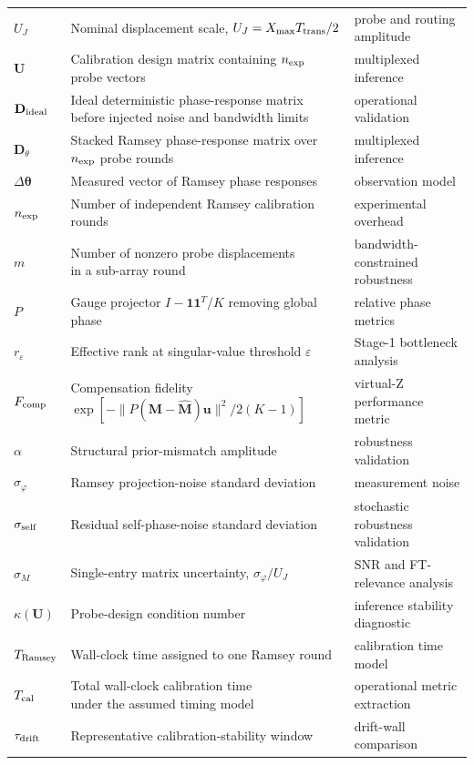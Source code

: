 \documentclass[a4paper,twocolumn,11pt]{quantumarticle}
\begin{document}
\begin{table}[t!]
\begin{tabular}{lll}
$U_J$ & \makecell[l]{Nominal displacement scale, \\ $U_J=X_{\max}T_{\rm trans}/2$} & probe and routing amplitude \\
$\mathbf U$ & \makecell[l]{Calibration design matrix containing \\ $n_{\rm exp}$ probe vectors} & multiplexed inference \\
$\mathbf D_{\rm ideal}$ & \makecell[l]{Ideal deterministic phase-response matrix \\ before injected noise and bandwidth limits} & operational validation \\
$\mathbf D_\theta$ & \makecell[l]{Stacked Ramsey phase-response matrix \\ over $n_{\rm exp}$ probe rounds} & multiplexed inference \\
$\Delta\boldsymbol\theta$ & Measured vector of Ramsey phase responses & observation model \\
$n_{\rm exp}$ & Number of independent Ramsey calibration rounds & experimental overhead \\
$m$ & \makecell[l]{Number of nonzero probe displacements \\ in a sub-array round} & bandwidth-constrained robustness \\
$P$ & \makecell[l]{Gauge projector $I-\mathbf 1\mathbf 1^{T}/K$ \\ removing global phase} & relative phase metrics \\
$r_\varepsilon$ & Effective rank at singular-value threshold $\varepsilon$ & Stage-1 bottleneck analysis \\
$F_{\rm comp}$ & \makecell[l]{Compensation fidelity \\ $\exp[-\|P(\mathbf M-\hat{\mathbf M})\mathbf u\|^2/2(K-1)]$} & virtual-Z performance metric \\
$\alpha$ & Structural prior-mismatch amplitude & robustness validation \\
$\sigma_\varphi$ & Ramsey projection-noise standard deviation & measurement noise \\
$\sigma_{\rm self}$ & Residual self-phase-noise standard deviation & stochastic robustness validation \\
$\sigma_M$ & Single-entry matrix uncertainty, $\sigma_\varphi/U_J$ & SNR and FT-relevance analysis \\
$\kappa(\mathbf U)$ & Probe-design condition number & inference stability diagnostic \\
$T_{\rm Ramsey}$ & Wall-clock time assigned to one Ramsey round & calibration time model \\
$T_{\rm cal}$ & \makecell[l]{Total wall-clock calibration time \\ under the assumed timing model} & operational metric extraction \\
$\tau_{\rm drift}$ & Representative calibration-stability window & drift-wall comparison \\
\hline
\end{tabular}
\end{table}
\end{document}
